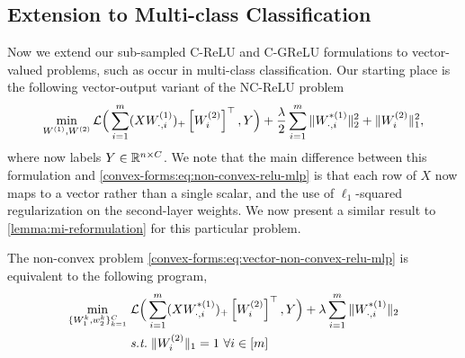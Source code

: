 \subsection{Extension to Multi-class Classification}\label{app:multi-class-extension}

Now we extend our sub-sampled C-ReLU and C-GReLU formulations to vector-valued
problems, such as occur in multi-class classification.
Our starting place is the following vector-output variant of the NC-ReLU problem
\begin{equation}\label{convex-forms:eq:vector-non-convex-relu-mlp}
    \min_{W^{(1)}, W^{(2)}} \mathcal{L}\Big(\sum_{i=1}^m
    (XW^{(1)}_{\cdot, i})_+ \left[W^{(2)}_{i}\right]^\top, Y\Big) +
    \frac{\lambda}{2}\sum_{i=1}^m \|W^{*(1)}_{\cdot, i}\|_2^2 + \|W^{(2)}_{i}\|_1^2,
\end{equation}
where now labels \(Y \in \mathbb{R}^{n \times C}\).
We note that the main difference between this formulation and
\cref{convex-forms:eq:non-convex-relu-mlp} is that each row of \(X\) now maps
to a vector rather than a single scalar, and the use of \(\ell_1\)-squared
regularization on the second-layer weights.
We now present a similar result to
\cref{lemma:mi-reformulation} for this particular problem.
\begin{lemma}
    The non-convex problem \eqref{convex-forms:eq:vector-non-convex-relu-mlp} is equivalent to the following program,
    \begin{equation}\label{convex-forms:eq:vector-mi-reformulation}
        \begin{aligned}
            \min_{\{W_{1}^k, w_{2}^k\}_{k=1}^C}  \; & \mathcal{L}\Big(\sum_{i=1}^m (XW^{*(1)}_{\cdot, i})_+ \left[W^{(2)}_{i}\right]^\top, Y\Big) + \lambda \sum_{i = 1}^{m}  \|W^{*(1)}_{\cdot, i}\|_2 \\
                                                    & \text{\emph{s.t.}} \;\|W^{(2)}_{i}\|_1 = 1~\forall i \in [m]
        \end{aligned}
    \end{equation}
\end{lemma}
